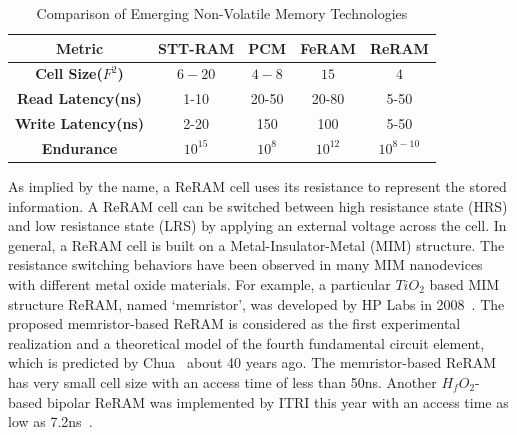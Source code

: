 \begin{table}[!tb]
  \centering
  \scriptsize
    \scriptsize
  \caption{Comparison of Emerging Non-Volatile Memory Technologies}\label{table:compare}
  \vspace{-0pt}
  \begin{tabular}{|c|cccc|}
    \hline
    \textbf{Metric} & \textbf{STT-RAM} & \textbf{PCM}    & \textbf{FeRAM} & \textbf{ReRAM}
    \\\hline
    \textbf{Cell Size($F^2$)} & $6-20$ & $4-8$ & $15$ & $4$\\\hline
    \textbf{Read Latency(ns)} &  1-10 & 20-50 & 20-80 & 5-50\\\hline
    \textbf{Write Latency(ns)} & 2-20& 150& 100& 5-50\\\hline
    \textbf{Endurance} &  $10^{15}$ & $10^8$ & $10^{12}$ & $10^{8-10}$\\\hline
  \end{tabular}
  \vspace{-5pt}
\end{table}


As implied by the name, a ReRAM cell uses its resistance to represent the stored information. A ReRAM cell can be switched between high resistance state (HRS) and low resistance state (LRS) by applying an external voltage across the cell.
In general, a ReRAM cell is built on a Metal-Insulator-Metal (MIM) structure. The resistance switching behaviors have been observed in many MIM nanodevices with different metal oxide materials. For example, a particular $TiO_2$ based MIM structure ReRAM, named `memristor', was developed by HP Labs in 2008~\cite{memristor:missing}. The proposed memristor-based ReRAM is considered as the first experimental realization and a theoretical model of the fourth fundamental circuit element, which is predicted by Chua~\cite{memristor:chua} about 40 years ago. The memristor-based ReRAM has very small cell size with an access time of less than 50ns. %
Another $H_fO_2$-based bipolar ReRAM was implemented by ITRI this year with an access time as low as 7.2ns~\cite{ReRAM_ISSCC2011_Sheu}.

